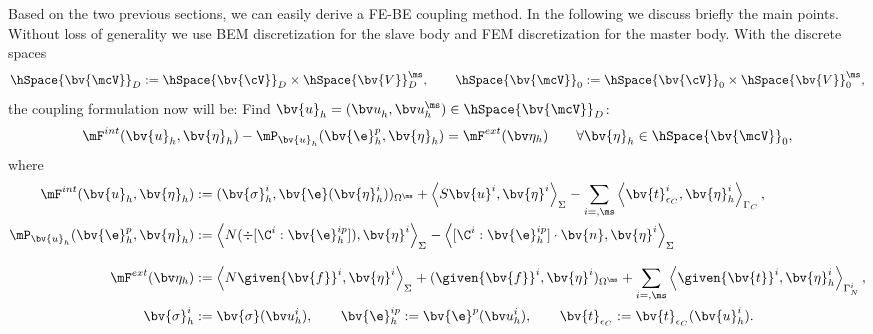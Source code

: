 Based on the two previous sections, we can easily derive a  FE-BE coupling method. In the following we discuss briefly the main points. Without loss of generality we use BEM discretization for the slave body and FEM discretization for the master body. With the  discrete spaces
\[
\hSpace{\bv{\mcV}}_D := \hSpace{\bv{\cV}}^{\sl}_D \times \hSpace{\bv{V}}^{\ms}_D, \qquad \hSpace{\bv{\mcV}}_0 := \hSpace{\bv{\cV}}^{\sl}_0 \times \hSpace{\bv{V}}^{\ms}_0,
\]
the coupling formulation now will be: Find $\bv{u}_{h} = (\bv u^{\sl}_h,\bv u^{\ms}_h) \in \hSpace{\bv{\mcV}}_D$:
\begin{equation}  \label{WeakFormF_FEMBEM}
\mF^{int}(\bv{u}_{h},\bv{\eta}_h) - \mP_{\bv{u}_{h}} ( \bv{\e}_{h}^p,\bv{\eta}_h) = \mF^{ext}(\bv\eta_h) \qquad \forall \bv{\eta}_h \in \hSpace{\bv{\mcV}}_0,
\end{equation}
where
\begin{align*}
\mF^{int}(\bv{u}_{h},\bv{\eta}_h) &:= 
(\bv{\sigma}_{h}^i,\bv{\e}(\bv{\eta}^i_h))_{\Omega^{\ms}} 
+ \left\langle S \bv{u}^i, \bv{\eta}^i \right\rangle_{\Sigma^{\sl}} 
- \sum_{i=\sl,\ms} \left\langle \bv{t}_{\epsilon_C}^i, \bv{\eta}^i_h\right\rangle_{\Gamma_C}, \\
\mP_{\bv{u}_{h}} ( \bv{\e}_{h}^p,\bv{\eta}_h) &:= 
 \left\langle  N (\div[\C^i : \bv{\e}_{h}^{ip}]), \bv{\eta}^i \right\rangle_{\Sigma^{\sl}}
- \left\langle [\C^i : \bv{\e}_{h}^{ip}] \cdot \bv{n}, \bv{\eta}^i\right\rangle_{\Sigma^{\sl}} \\[2ex]
\mF^{ext}(\bv\eta_h) &:= 
\left\langle N \given{\bv{f}}^i, \bv{\eta}^i \right\rangle_{\Sigma^{\sl}}
+ ( \given{\bv{f}}^i, \bv{\eta}^i)_{\Omega^{\ms}}
+ \sum_{i=\sl,\ms} \left\langle \given{\bv{t}}^i, \bv{\eta}^i_h \right\rangle_{\Gamma^i_N}, \\
\bv{\sigma}^i_h &:= \bv{\sigma}(\bv u^i_h), \qquad \bv{\e}_{h}^{ip} := \bv{\e}^p(\bv u^i_h), \qquad \bv{t}_{\epsilon_C} := \bv{t}_{\epsilon_C}(\bv{u}^i_h).
\end{align*}

